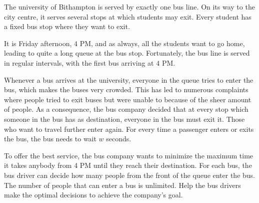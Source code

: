 






%
The university of Bithampton\xspace is served by exactly one bus line.
On its way to the city centre, it serves several stops at which students may exit.
Every student has a fixed bus stop where they want to exit.

It is Friday afternoon, $4$ PM, and as always, all the students want to go home, leading to quite a long queue at the bus stop.
Fortunately, the bus line is served in regular intervals, with the first bus arriving at $4$ PM.

Whenever a bus arrives at the university, everyone in the queue tries to enter the bus, which makes the buses very crowded.
This has led to numerous complaints where people tried to exit buses but were unable to because of the sheer amount of people.
As a consequence, the bus company decided that at every stop which someone in the bus has as destination, everyone in the bus must exit it.
Those who want to travel further enter again.
For every time a passenger enters or exits the bus, the bus needs to wait $w$ seconds.


To offer the best service, the bus company wants to minimize the maximum time it takes anybody from 4 PM until they reach their destination.
For each bus, the bus driver can decide how many people from the front of the queue enter the bus. The number of people that can enter a bus is unlimited.
Help the bus drivers make the optimal decisions to achieve the company's goal.

